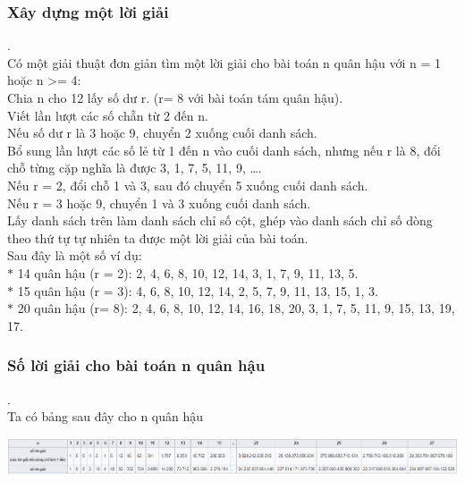 \documentclass{hcmutarticle}
\begin{document}
\subsubsection{Xây dựng một lời giải}.
\\
Có một giải thuật đơn giản tìm một lời giải cho bài toán n quân hậu với n = 1 hoặc n >= 4:\\
Chia n cho 12 lấy số dư r. (r= 8 với bài toán tám quân hậu).\\
Viết lần lượt các số chẵn từ 2 đến n.\\
Nếu số dư r là 3 hoặc 9, chuyển 2 xuống cuối danh sách.\\
Bổ sung lần lượt các số lẻ từ 1 đến n vào cuối danh sách, nhưng nếu r là 8, đổi chỗ từng cặp nghĩa là được 3, 1, 7, 5, 11, 9, ….\\
Nếu r = 2, đổi chỗ 1 và 3, sau đó chuyển 5 xuống cuối danh sách.\\
Nếu r = 3 hoặc 9, chuyển 1 và 3 xuống cuối danh sách.\\
Lấy danh sách trên làm danh sách chỉ số cột, ghép vào danh sách chỉ số dòng theo thứ tự tự nhiên ta được một lời giải của bài toán.\\
Sau đây là một số ví dụ: \\
$*$ 14 quân hậu (r = 2): 2, 4, 6, 8, 10, 12, 14, 3, 1, 7, 9, 11, 13, 5.\\
$*$ 15 quân hậu (r = 3): 4, 6, 8, 10, 12, 14, 2, 5, 7, 9, 11, 13, 15, 1, 3.\\
$*$ 20 quân hậu (r= 8): 2, 4, 6, 8, 10, 12, 14, 16, 18, 20, 3, 1, 7, 5, 11, 9, 15, 13, 19, 17.\\

\subsubsection{Số lời giải cho bài toán n quân hậu}.
\\
Ta có bảng sau đây cho n quân hậu
\begin{center}
\includegraphics[scale=0.45]{image/n-board}\\[1cm]
\end{center}
\end{document}
